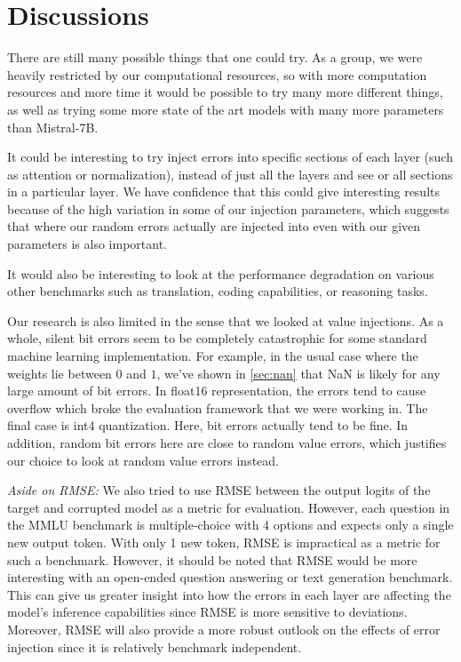 \section{Discussions}
There are still many possible things that one could try. As a group, we were heavily restricted by our computational resources, so with more computation resources
and more time it would be possible to try many more different things, as well as trying some more state of the art models with many more parameters than
Mistral-7B.

It could be interesting to try inject errors into specific sections of each layer (such as attention or normalization), instead of just all the layers and see
or all sections in a particular layer. We have confidence that this could give interesting results because of the high variation in some of our injection parameters,
which suggests that where our random errors actually are injected into even with our given parameters is also important.

It would also be interesting to look at the performance degradation on various other benchmarks such as translation, coding capabilities, or reasoning tasks.

Our research is also limited in the sense that we looked at value injections. As a whole, silent bit errors seem to be completely catastrophic for
some standard machine learning implementation. For example, in the usual case where the weights lie between $0$ and $1$, we've shown in \ref{sec:nan} that NaN
is likely for any large amount of bit errors. In float16 representation, the errors tend to cause overflow which broke the evaluation framework that we were working in.
The final case is int4 quantization. Here, bit errors actually tend to be fine. In addition, random bit errors here are close to random value errors, which justifies our choice to look at
random value errors instead.

\textit{Aside on RMSE:} We also tried to use RMSE between the output logits of the target and corrupted model as a metric for evaluation. However, each question in the MMLU benchmark is multiple-choice with 4 options and expects only a single new output token. With only 1 new token, RMSE is impractical as a metric for such a benchmark. However, it should be noted that RMSE would be more interesting with an open-ended question answering or text generation benchmark. This can give us greater insight into how the errors in each layer are affecting the model's inference capabilities since RMSE is more sensitive to deviations. Moreover, RMSE will also provide a more robust outlook on the effects of error injection since it is relatively benchmark independent.

